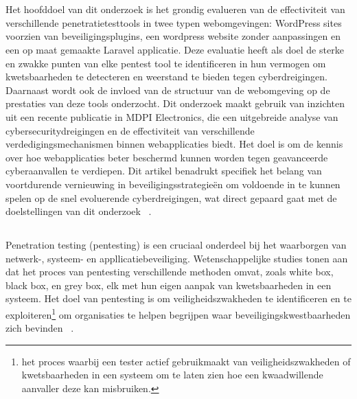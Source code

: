 \chapter{}%
\label{ch:stand-van-zaken}


\section{}

Het hoofddoel van dit onderzoek is het grondig evalueren van de effectiviteit van verschillende penetratietesttools in twee typen webomgevingen: 
WordPress sites voorzien van beveiligingsplugins, een wordpress website zonder aanpassingen en een op maat gemaakte Laravel applicatie. Deze evaluatie 
heeft als doel de sterke en zwakke punten van elke pentest tool te identificeren in hun vermogen om kwetsbaarheden te detecteren en weerstand te bieden 
tegen cyberdreigingen. Daarnaast wordt ook de invloed van de structuur van de webomgeving op de prestaties van deze tools onderzocht.
Dit onderzoek maakt gebruik van inzichten uit een recente publicatie in MDPI Electronics, die een uitgebreide analyse van cybersecuritydreigingen en 
de effectiviteit van verschillende verdedigingsmechanismen binnen webapplicaties biedt. Het doel is om de kennis over hoe webapplicaties beter 
beschermd kunnen worden tegen geavanceerde cyberaanvallen te verdiepen. Dit artikel benadrukt specifiek het belang van voortdurende vernieuwing 
in beveiligingsstrategieën om voldoende in te kunnen spelen op de snel evoluerende cyberdreigingen, wat direct gepaard gaat met de doelstellingen van dit 
onderzoek ~\autocite{Altulaihan2023}.

\section{}
\label{sec:pentesting}
Penetration testing (pentesting) is een cruciaal onderdeel bij het waarborgen van netwerk-, systeem- en appllicatiebeveiliging. 
Wetenschappelijke studies tonen aan dat het proces van pentesting verschillende methoden omvat, zoals white box, 
black box, en grey box, elk met hun eigen aanpak van kwetsbaarheden in een systeem. Het doel van pentesting is om 
veiligheidszwakheden te identificeren en te exploiteren\footnote{het proces waarbij een tester actief gebruikmaakt 
van veiligheidszwakheden of kwetsbaarheden in een systeem om te laten zien hoe een kwaadwillende aanvaller deze kan misbruiken.} 
om organisaties te helpen begrijpen waar beveiligingskwestbaarheden zich bevinden ~\autocite{Alhamed2023}.


